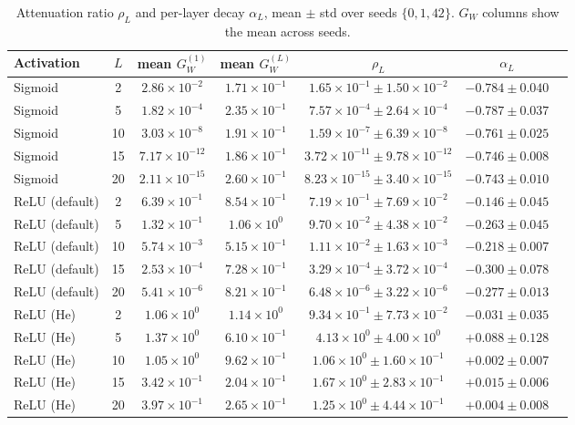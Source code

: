 \documentclass[11pt,a4paper]{article}
\begin{document}
\begin{table}[H]
\centering
\caption{Attenuation ratio $\rho_L$ and per-layer decay $\alpha_L$, mean $\pm$ std over seeds $\{0,1,42\}$. $G_W$ columns show the mean across seeds.}
\label{tab:rho}
{\small
\setlength{\tabcolsep}{4pt}
\begin{tabular}{lcccccc}
\toprule
Activation & $L$ & mean $G_W^{(1)}$ & mean $G_W^{(L)}$ & $\rho_L$ & $\alpha_L$ \\
\midrule
Sigmoid & 2  & $2.86\times10^{-2}$ & $1.71\times10^{-1}$ & $1.65\times10^{-1} \pm 1.50\times10^{-2}$ & $-0.784 \pm 0.040$ \\
Sigmoid & 5  & $1.82\times10^{-4}$ & $2.35\times10^{-1}$ & $7.57\times10^{-4} \pm 2.64\times10^{-4}$ & $-0.787 \pm 0.037$ \\
Sigmoid & 10 & $3.03\times10^{-8}$ & $1.91\times10^{-1}$ & $1.59\times10^{-7} \pm 6.39\times10^{-8}$ & $-0.761 \pm 0.025$ \\
Sigmoid & 15 & $7.17\times10^{-12}$ & $1.86\times10^{-1}$ & $3.72\times10^{-11} \pm 9.78\times10^{-12}$ & $-0.746 \pm 0.008$ \\
Sigmoid & 20 & $2.11\times10^{-15}$ & $2.60\times10^{-1}$ & $8.23\times10^{-15} \pm 3.40\times10^{-15}$ & $-0.743 \pm 0.010$ \\
ReLU (default) & 2  & $6.39\times10^{-1}$ & $8.54\times10^{-1}$ & $7.19\times10^{-1} \pm 7.69\times10^{-2}$ & $-0.146 \pm 0.045$ \\
ReLU (default) & 5  & $1.32\times10^{-1}$ & $1.06\times10^{0}$ & $9.70\times10^{-2} \pm 4.38\times10^{-2}$ & $-0.263 \pm 0.045$ \\
ReLU (default) & 10 & $5.74\times10^{-3}$ & $5.15\times10^{-1}$ & $1.11\times10^{-2} \pm 1.63\times10^{-3}$ & $-0.218 \pm 0.007$ \\
ReLU (default) & 15 & $2.53\times10^{-4}$ & $7.28\times10^{-1}$ & $3.29\times10^{-4} \pm 3.72\times10^{-4}$ & $-0.300 \pm 0.078$ \\
ReLU (default) & 20 & $5.41\times10^{-6}$ & $8.21\times10^{-1}$ & $6.48\times10^{-6} \pm 3.22\times10^{-6}$ & $-0.277 \pm 0.013$ \\
ReLU (He) & 2  & $1.06\times10^{0}$ & $1.14\times10^{0}$ & $9.34\times10^{-1} \pm 7.73\times10^{-2}$ & $-0.031 \pm 0.035$ \\
ReLU (He) & 5  & $1.37\times10^{0}$ & $6.10\times10^{-1}$ & $4.13\times10^{0} \pm 4.00\times10^{0}$ & $+0.088 \pm 0.128$ \\
ReLU (He) & 10 & $1.05\times10^{0}$ & $9.62\times10^{-1}$ & $1.06\times10^{0} \pm 1.60\times10^{-1}$ & $+0.002 \pm 0.007$ \\
ReLU (He) & 15 & $3.42\times10^{-1}$ & $2.04\times10^{-1}$ & $1.67\times10^{0} \pm 2.83\times10^{-1}$ & $+0.015 \pm 0.006$ \\
ReLU (He) & 20 & $3.97\times10^{-1}$ & $2.65\times10^{-1}$ & $1.25\times10^{0} \pm 4.44\times10^{-1}$ & $+0.004 \pm 0.008$ \\
\bottomrule
\end{tabular}}
\end{table}
\end{document}
